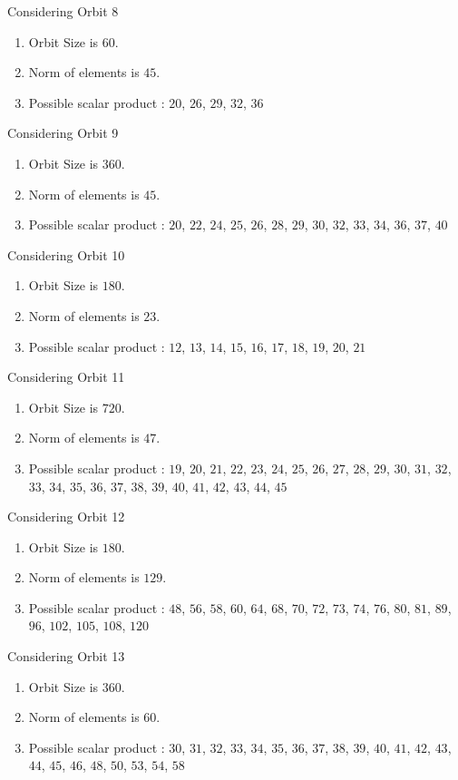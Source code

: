 \documentclass[12pt]{article}
\begin{document}
Considering Orbit 8
\begin{enumerate}
\item Orbit Size is $60$.
\item Norm of elements is $45$.
\item Possible scalar product : $20$, $26$, $29$, $32$, $36$
\end{enumerate}
Considering Orbit 9
\begin{enumerate}
\item Orbit Size is $360$.
\item Norm of elements is $45$.
\item Possible scalar product : $20$, $22$, $24$, $25$, $26$, $28$, $29$, $30$, $32$, $33$, $34$, $36$, $37$, $40$
\end{enumerate}
Considering Orbit 10
\begin{enumerate}
\item Orbit Size is $180$.
\item Norm of elements is $23$.
\item Possible scalar product : $12$, $13$, $14$, $15$, $16$, $17$, $18$, $19$, $20$, $21$
\end{enumerate}
Considering Orbit 11
\begin{enumerate}
\item Orbit Size is $720$.
\item Norm of elements is $47$.
\item Possible scalar product : $19$, $20$, $21$, $22$, $23$, $24$, $25$, $26$, $27$, $28$, $29$, $30$, $31$, $32$, $33$, $34$, $35$, $36$, $37$, $38$, $39$, $40$, $41$, $42$, $43$, $44$, $45$
\end{enumerate}
Considering Orbit 12
\begin{enumerate}
\item Orbit Size is $180$.
\item Norm of elements is $129$.
\item Possible scalar product : $48$, $56$, $58$, $60$, $64$, $68$, $70$, $72$, $73$, $74$, $76$, $80$, $81$, $89$, $96$, $102$, $105$, $108$, $120$
\end{enumerate}
Considering Orbit 13
\begin{enumerate}
\item Orbit Size is $360$.
\item Norm of elements is $60$.
\item Possible scalar product : $30$, $31$, $32$, $33$, $34$, $35$, $36$, $37$, $38$, $39$, $40$, $41$, $42$, $43$, $44$, $45$, $46$, $48$, $50$, $53$, $54$, $58$
\end{enumerate}
\end{document}
